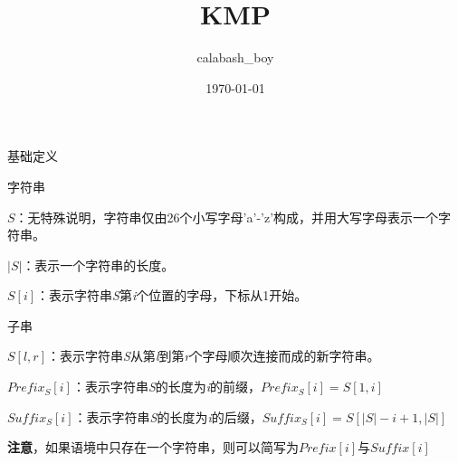 \documentclass{ctexbeamer}		%
\date{}	%
\title[String]{KMP}	%
\author[calabash\_boy]{calabash\_boy} %
\date{\today}
\begin{document}


\begin{frame}	

\titlepage	%
	
\end{frame}		



\begin{frame}{基础定义}	

\begin{block}{字符串}	%

$S$：无特殊说明，字符串仅由26个小写字母'a'-'z'构成，并用大写字母表示一个字符串。

$|S|$：表示一个字符串的长度。

$S[i]$：表示字符串\textit{S}第\textit{i}个位置的字母，下标从1开始。

\end{block}

\pause

\begin{block}{子串}

$S[l,r]$：表示字符串\textit{S}从第\textit{l}到第\textit{r}个字母顺次连接而成的新字符串。

$Prefix_{S}[i]$：表示字符串\textit{S}的长度为\textit{i}的前缀，$Prefix_{S}[i] = S[1,i]$

$Suffix_{S}[i]$：表示字符串\textit{S}的长度为\textit{i}的后缀，$Suffix_{S}[i] = S[|S| - i + 1, |S|]$

\hphantom{ }

\textbf{注意}，如果语境中只存在一个字符串，则可以简写为$Prefix[i]$与$Suffix[i]$

\end{block}

\end{frame}
\end{document}
